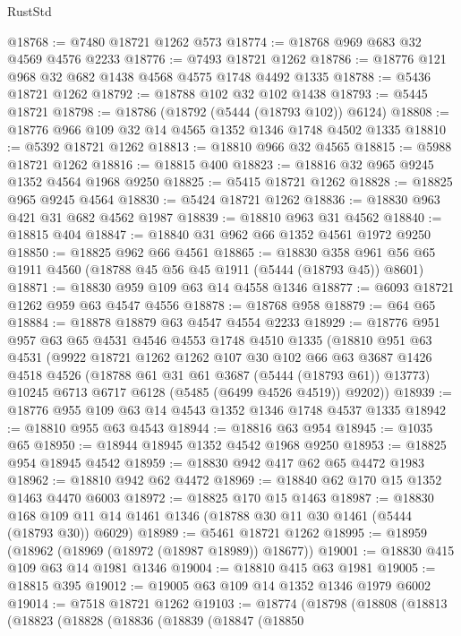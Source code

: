 \begin{lexlean}{RustStd}
\begin{coremodule}
@18768 := @7480 @18721 @1262 @573
@18774 := @18768 @969 @683 @32 @4569 @4576 @2233
@18776 := @7493 @18721 @1262
@18786 := @18776 @121 @968 @32 @682 @1438 @4568 @4575 @1748 @4492 @1335
@18788 := @5436 @18721 @1262
@18792 := @18788 @102 @32 @102 @1438
@18793 := @5445 @18721
@18798 := @18786 (@18792 (@5444 (@18793 @102)) @6124)
@18808 := @18776 @966 @109 @32 @14 @4565 @1352 @1346 @1748 @4502 @1335
@18810 := @5392 @18721 @1262
@18813 := @18810 @966 @32 @4565
@18815 := @5988 @18721 @1262
@18816 := @18815 @400
@18823 := @18816 @32 @965 @9245 @1352 @4564 @1968 @9250
@18825 := @5415 @18721 @1262
@18828 := @18825 @965 @9245 @4564
@18830 := @5424 @18721 @1262
@18836 := @18830 @963 @421 @31 @682 @4562 @1987
@18839 := @18810 @963 @31 @4562
@18840 := @18815 @404
@18847 := @18840 @31 @962 @66 @1352 @4561 @1972 @9250
@18850 := @18825 @962 @66 @4561
@18865 := @18830 @358 @961 @56 @65 @1911 @4560 (@18788 @45 @56 @45 @1911 (@5444 (@18793 @45)) @8601)
@18871 := @18830 @959 @109 @63 @14 @4558 @1346
@18877 := @6093 @18721 @1262 @959 @63 @4547 @4556
@18878 := @18768 @958
@18879 := @64 @65
@18884 := @18878 @18879 @63 @4547 @4554 @2233
@18929 := @18776
    @951
    @957
    @63
    @65
    @4531
    @4546
    @4553
    @1748
    @4510
    @1335
    (@18810
      @951
      @63
      @4531
      (@9922
        @18721
        @1262
        @1262
        @107
        @30
        @102
        @66
        @63
        @3687
        @1426
        @4518
        @4526
        (@18788 @61 @31 @61 @3687 (@5444 (@18793 @61)) @13773)
        @10245
        @6713
        @6717
        @6128
        (@5485 (@6499 @4526 @4519))
        @9202))
@18939 := @18776 @955 @109 @63 @14 @4543 @1352 @1346 @1748 @4537 @1335
@18942 := @18810 @955 @63 @4543
@18944 := @18816 @63 @954
@18945 := @1035 @65
@18950 := @18944 @18945 @1352 @4542 @1968 @9250
@18953 := @18825 @954 @18945 @4542
@18959 := @18830 @942 @417 @62 @65 @4472 @1983
@18962 := @18810 @942 @62 @4472
@18969 := @18840 @62 @170 @15 @1352 @1463 @4470 @6003
@18972 := @18825 @170 @15 @1463
@18987 := @18830 @168 @109 @11 @14 @1461 @1346 (@18788 @30 @11 @30 @1461 (@5444 (@18793 @30)) @6029)
@18989 := @5461 @18721 @1262
@18995 := @18959 (@18962 (@18969 (@18972 (@18987 @18989)) @18677))
@19001 := @18830 @415 @109 @63 @14 @1981 @1346
@19004 := @18810 @415 @63 @1981
@19005 := @18815 @395
@19012 := @19005 @63 @109 @14 @1352 @1346 @1979 @6002
@19014 := @7518 @18721 @1262
@19103 := @18774
    (@18798
      (@18808
        (@18813
          (@18823
            (@18828
              (@18836
                (@18839
                  (@18847
                    (@18850

\end{coremodule}
\end{lexlean}
